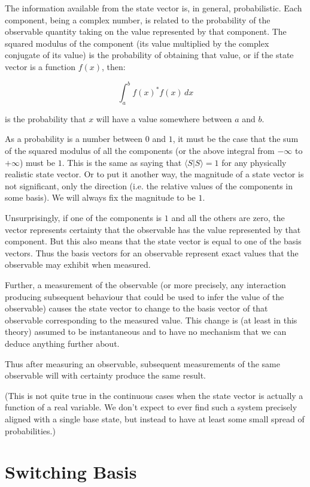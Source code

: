 The information available from the state vector is, in general, probabilistic. Each component, being a complex number, is related to the probability of the observable quantity taking on the value represented by that component. The squared modulus of the component (its value multiplied by the complex conjugate of its value) is the probability of obtaining that value, or if the state vector is a function $f(x)$, then:

$$\int_{a}^{b} f(x)^* f(x) \, dx$$

is the probability that $x$ will have a value somewhere between $a$ and $b$.

As a probability is a number between $0$ and $1$, it must be the case that the sum of the squared modulus of all the components (or the above integral from $-\infty$ to $+\infty$) must be $1$. This is the same as saying that $\langle S | S \rangle = 1$ for any physically realistic state vector. Or to put it another way, the magnitude of a state vector is not significant, only the direction (i.e. the relative values of the components in some basis). We will always fix the magnitude to be $1$.

Unsurprisingly, if one of the components is $1$ and all the others are zero, the vector represents certainty that the observable has the value represented by that component. But this also means that the state vector is equal to one of the basis vectors. Thus the basis vectors for an observable represent exact values that the observable may exhibit when measured.

Further, a measurement of the observable (or more precisely, any interaction producing subsequent behaviour that could be used to infer the value of the observable) causes the state vector to change to the basis vector of that observable corresponding to the measured value. This change is (at least in this theory) assumed to be instantaneous and to have no mechanism that we can deduce anything further about.

Thus after measuring an observable, subsequent measurements of the same observable will with certainty produce the same result.

(This is not quite true in the continuous cases when the state vector is actually a function of a real variable. We don't expect to ever find such a system precisely aligned with a single base state, but instead to have at least some small spread of probabilities.)

\section{Switching Basis}

